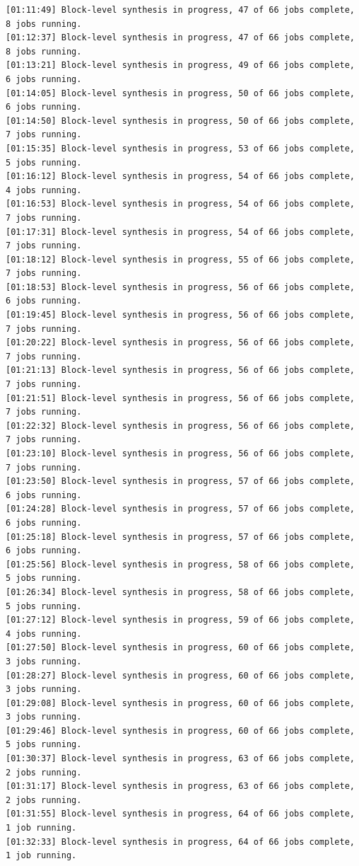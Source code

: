 \begin{lstlisting}
[01:11:49] Block-level synthesis in progress, 47 of 66 jobs complete, 8 jobs running.
[01:12:37] Block-level synthesis in progress, 47 of 66 jobs complete, 8 jobs running.
[01:13:21] Block-level synthesis in progress, 49 of 66 jobs complete, 6 jobs running.
[01:14:05] Block-level synthesis in progress, 50 of 66 jobs complete, 6 jobs running.
[01:14:50] Block-level synthesis in progress, 50 of 66 jobs complete, 7 jobs running.
[01:15:35] Block-level synthesis in progress, 53 of 66 jobs complete, 5 jobs running.
[01:16:12] Block-level synthesis in progress, 54 of 66 jobs complete, 4 jobs running.
[01:16:53] Block-level synthesis in progress, 54 of 66 jobs complete, 7 jobs running.
[01:17:31] Block-level synthesis in progress, 54 of 66 jobs complete, 7 jobs running.
[01:18:12] Block-level synthesis in progress, 55 of 66 jobs complete, 7 jobs running.
[01:18:53] Block-level synthesis in progress, 56 of 66 jobs complete, 6 jobs running.
[01:19:45] Block-level synthesis in progress, 56 of 66 jobs complete, 7 jobs running.
[01:20:22] Block-level synthesis in progress, 56 of 66 jobs complete, 7 jobs running.
[01:21:13] Block-level synthesis in progress, 56 of 66 jobs complete, 7 jobs running.
[01:21:51] Block-level synthesis in progress, 56 of 66 jobs complete, 7 jobs running.
[01:22:32] Block-level synthesis in progress, 56 of 66 jobs complete, 7 jobs running.
[01:23:10] Block-level synthesis in progress, 56 of 66 jobs complete, 7 jobs running.
[01:23:50] Block-level synthesis in progress, 57 of 66 jobs complete, 6 jobs running.
[01:24:28] Block-level synthesis in progress, 57 of 66 jobs complete, 6 jobs running.
[01:25:18] Block-level synthesis in progress, 57 of 66 jobs complete, 6 jobs running.
[01:25:56] Block-level synthesis in progress, 58 of 66 jobs complete, 5 jobs running.
[01:26:34] Block-level synthesis in progress, 58 of 66 jobs complete, 5 jobs running.
[01:27:12] Block-level synthesis in progress, 59 of 66 jobs complete, 4 jobs running.
[01:27:50] Block-level synthesis in progress, 60 of 66 jobs complete, 3 jobs running.
[01:28:27] Block-level synthesis in progress, 60 of 66 jobs complete, 3 jobs running.
[01:29:08] Block-level synthesis in progress, 60 of 66 jobs complete, 3 jobs running.
[01:29:46] Block-level synthesis in progress, 60 of 66 jobs complete, 5 jobs running.
[01:30:37] Block-level synthesis in progress, 63 of 66 jobs complete, 2 jobs running.
[01:31:17] Block-level synthesis in progress, 63 of 66 jobs complete, 2 jobs running.
[01:31:55] Block-level synthesis in progress, 64 of 66 jobs complete, 1 job running.
[01:32:33] Block-level synthesis in progress, 64 of 66 jobs complete, 1 job running.

\end{lstlisting}

